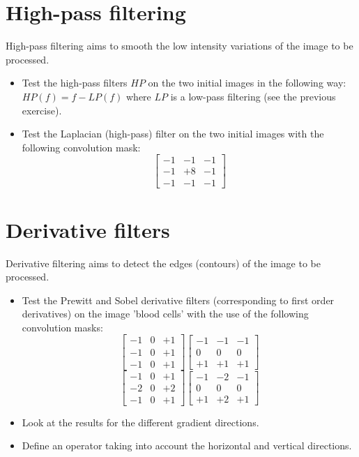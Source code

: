 \section{High-pass filtering}

High-pass filtering aims to smooth the low intensity variations of the image to be processed.
\begin{qbox}
\begin{itemize}
	\item Test the high-pass filters $HP$ on the two initial images in the following way: 
	$HP(f)=f-LP(f)$ where $LP$ is a low-pass filtering (see the previous exercise).
	\item Test the Laplacian \label{lbl:introduction:laplacien}(high-pass) filter on the two initial images with the following convolution mask:
$$
\left[
\begin{array}{ccc}
-1&-1&-1\\
-1&+8&-1\\
-1&-1&-1
\end{array}
\right]
$$
\end{itemize}
\end{qbox}


\section{Derivative filters}

Derivative filtering aims to detect the edges (contours) of the image to be processed.
\begin{qbox}
\begin{itemize}
	\item
Test the Prewitt and Sobel derivative filters (corresponding to first order derivatives) on the image 'blood cells' with the use of the following convolution masks:
$$
\left[
\begin{array}{ccc}
-1&0&+1\\
-1&0&+1\\
-1&0&+1
\end{array}
\right]
\left[
\begin{array}{rrr}
-1&-1&-1\\
0&0&0\\
+1&+1&+1
\end{array}
\right]
$$
$$
\left[
\begin{array}{ccc}
-1&0&+1\\
-2&0&+2\\
-1&0&+1
\end{array}
\right]
\left[
\begin{array}{rrr}
-1&-2&-1\\
0&0&0\\
+1&+2&+1
\end{array}
\right]
$$
\item Look at the results for the different gradient directions.
\item Define an operator taking into account the horizontal and vertical directions.
\end{itemize}
\end{qbox}

